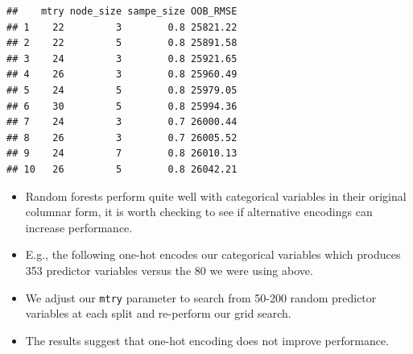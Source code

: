 \documentclass[
  10pt,
  ignorenonframetext,
]{beamer}
\newenvironment{Shaded}{}{}
\newcommand{\DecValTok}[1]{#1}
\newcommand{\KeywordTok}[1]{\textcolor[rgb]{0.00,0.00,1.00}{#1}}
\newcommand{\NormalTok}[1]{#1}
\newcommand{\OperatorTok}[1]{#1}
\newcommand{\StringTok}[1]{\textcolor[rgb]{0.00,0.50,0.50}{#1}}
\providecommand{\tightlist}{%
  \setlength{\itemsep}{0pt}\setlength{\parskip}{0pt}}
\begin{document}
\begin{frame}[fragile]{}
\protect\hypertarget{section}{}

\begin{Shaded}
\end{Shaded}

\begin{verbatim}
##    mtry node_size sampe_size OOB_RMSE
## 1    22         3        0.8 25821.22
## 2    22         5        0.8 25891.58
## 3    24         3        0.8 25921.65
## 4    26         3        0.8 25960.49
## 5    24         5        0.8 25979.05
## 6    30         5        0.8 25994.36
## 7    24         3        0.7 26000.44
## 8    26         3        0.7 26005.52
## 9    24         7        0.8 26010.13
## 10   26         5        0.8 26042.21
\end{verbatim}

\begin{itemize}
\tightlist
\item
  Random forests perform quite well with categorical variables in their
  original columnar form, it is worth checking to see if alternative
  encodings can increase performance.
\item
  E.g., the following one-hot encodes our categorical variables which
  produces 353 predictor variables versus the 80 we were using above.
\item
  We adjust our \texttt{mtry} parameter to search from 50-200 random
  predictor variables at each split and re-perform our grid search.
\item
  The results suggest that one-hot encoding does not improve
  performance.
\end{itemize}

\end{frame}
\end{document}
